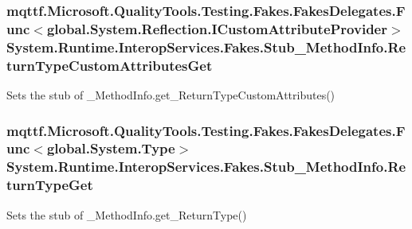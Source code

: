 \hypertarget{class_system_1_1_runtime_1_1_interop_services_1_1_fakes_1_1_stub___method_info_a9b533d538aa65c5b1a5bd3f2055610b1}{
\subsubsection[{Return\-Type\-Custom\-Attributes\-Get}]{\setlength{\rightskip}{0pt plus 5cm}mqttf.\-Microsoft.\-Quality\-Tools.\-Testing.\-Fakes.\-Fakes\-Delegates.\-Func$<$global.\-System.\-Reflection.\-I\-Custom\-Attribute\-Provider$>$ System.\-Runtime.\-Interop\-Services.\-Fakes.\-Stub\-\_\-\-Method\-Info.\-Return\-Type\-Custom\-Attributes\-Get}}\label{class_system_1_1_runtime_1_1_interop_services_1_1_fakes_1_1_stub___method_info_a9b533d538aa65c5b1a5bd3f2055610b1}


Sets the stub of \-\_\-\-Method\-Info.\-get\-\_\-\-Return\-Type\-Custom\-Attributes()

\hypertarget{class_system_1_1_runtime_1_1_interop_services_1_1_fakes_1_1_stub___method_info_ac13c806c0ceec021a2ef52dd50a20418}{
\subsubsection[{Return\-Type\-Get}]{\setlength{\rightskip}{0pt plus 5cm}mqttf.\-Microsoft.\-Quality\-Tools.\-Testing.\-Fakes.\-Fakes\-Delegates.\-Func$<$global.\-System.\-Type$>$ System.\-Runtime.\-Interop\-Services.\-Fakes.\-Stub\-\_\-\-Method\-Info.\-Return\-Type\-Get}}\label{class_system_1_1_runtime_1_1_interop_services_1_1_fakes_1_1_stub___method_info_ac13c806c0ceec021a2ef52dd50a20418}


Sets the stub of \-\_\-\-Method\-Info.\-get\-\_\-\-Return\-Type()

